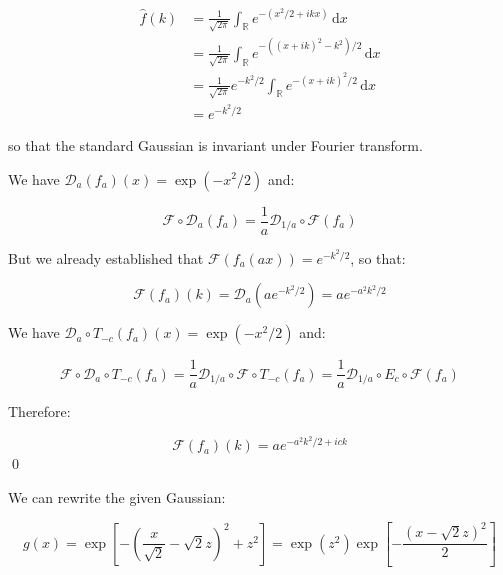 \documentclass[12pt]{article}
\begin{document}
\begin{equation}
\begin{split}
    \hat{f}(k) &= \frac{1}{\sqrt{2\pi}} \int_{\mathbb{R}} e^{-(x^{2}/2 + ikx)} \, \mathrm{d}x \\
    &= \frac{1}{\sqrt{2\pi}} \int_{\mathbb{R}} e^{-((x + ik)^{2} - k^{2})/2} \, \mathrm{d}x \\
    &= \frac{1}{\sqrt{2\pi}} e^{-k^{2}/2} \int_{\mathbb{R}} e^{-(x + ik)^{2}/2} \, \mathrm{d}x \\
    &= e^{-k^{2}/2}
\end{split}
\end{equation}

so that the standard Gaussian is invariant under Fourier transform.

We have $\mathcal{D}_{a}(f_{a})(x) = \exp(-x^{2}/2)$ and:

\begin{equation}
    \mathcal{F} \circ \mathcal{D}_{a}(f_{a}) = \frac{1}{a} \mathcal{D}_{1/a} \circ \mathcal{F}(f_{a})
\end{equation}

But we already established that $\mathcal{F}(f_{a}(ax)) = e^{-k^{2}/2}$, so that:

\begin{equation}
    \mathcal{F}(f_{a})(k) = \mathcal{D}_{a} \left( a e^{-k^{2}/2} \right) = a e^{-a^{2}k^{2}/2}
\end{equation}

We have $\mathcal{D}_{a} \circ T_{-c}(f_{a})(x) = \exp(-x^{2}/2)$ and:

\begin{equation}
    \mathcal{F} \circ \mathcal{D}_{a} \circ T_{-c}(f_{a}) = \frac{1}{a} \mathcal{D}_{1/a} \circ \mathcal{F} \circ T_{-c}(f_{a}) = \frac{1}{a} \mathcal{D}_{1/a} \circ E_{c} \circ \mathcal{F}(f_{a})
\end{equation}

Therefore:

\begin{equation}
    \mathcal{F}(f_{a})(k) = a e^{-a^{2}k^{2}/2 + ick}
\end{equation}
\qed



We can rewrite the given Gaussian:

\begin{equation}
    g(x) = \exp\left[ -\left( \frac{x}{\sqrt{2}} - \sqrt{2}z \right)^{2} + z^{2} \right] = \exp\left( z^{2} \right) \exp\left[ -\frac{(x - \sqrt{2}z)^{2}}{2} \right]
\end{equation}
\end{document}
